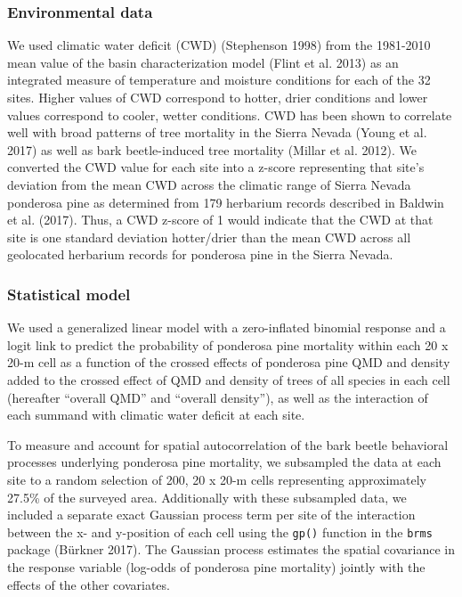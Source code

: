 \documentclass[]{article}
\begin{document}
\hypertarget{environmental-data}{%
\subsubsection{Environmental data}\label{environmental-data}}

We used climatic water deficit (CWD) (Stephenson 1998) from the
1981-2010 mean value of the basin characterization model (Flint et al.
2013) as an integrated measure of temperature and moisture conditions
for each of the 32 sites. Higher values of CWD correspond to hotter,
drier conditions and lower values correspond to cooler, wetter
conditions. CWD has been shown to correlate well with broad patterns of
tree mortality in the Sierra Nevada (Young et al. 2017) as well as bark
beetle-induced tree mortality (Millar et al. 2012). We converted the CWD
value for each site into a z-score representing that site's deviation
from the mean CWD across the climatic range of Sierra Nevada ponderosa
pine as determined from 179 herbarium records described in Baldwin et
al. (2017). Thus, a CWD z-score of 1 would indicate that the CWD at that
site is one standard deviation hotter/drier than the mean CWD across all
geolocated herbarium records for ponderosa pine in the Sierra Nevada.

\hypertarget{statistical-model}{%
\subsubsection{Statistical model}\label{statistical-model}}

We used a generalized linear model with a zero-inflated binomial
response and a logit link to predict the probability of ponderosa pine
mortality within each 20 x 20-m cell as a function of the crossed
effects of ponderosa pine QMD and density added to the crossed effect of
QMD and density of trees of all species in each cell (hereafter
``overall QMD'' and ``overall density''), as well as the interaction of
each summand with climatic water deficit at each site.

To measure and account for spatial autocorrelation of the bark beetle
behavioral processes underlying ponderosa pine mortality, we subsampled
the data at each site to a random selection of 200, 20 x 20-m cells
representing approximately 27.5\% of the surveyed area. Additionally
with these subsampled data, we included a separate exact Gaussian
process term per site of the interaction between the x- and y-position
of each cell using the \texttt{gp()} function in the \texttt{brms}
package (Bürkner 2017). The Gaussian process estimates the spatial
covariance in the response variable (log-odds of ponderosa pine
mortality) jointly with the effects of the other covariates.
\end{document}
